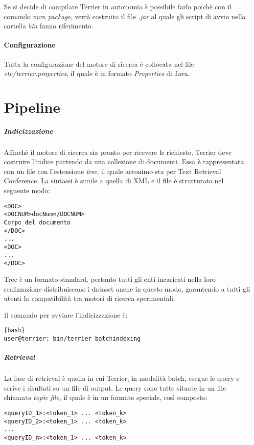 Se si decide di compilare Terrier in autonomia è possibile farlo poichè con il comando \textit{mvn package},
verrà costruito il file \textit{.jar} al quale gli script di avvio nella cartella \textit{bin} fanno riferimento.

\paragraph{Configurazione}
Tutta la configurazione del motore di ricerca è collocata nel file \textit{etc/terrier.properties}, il quale
è in formato \textit{Properties} di Java.

\section{Pipeline}
\subparagraph{Indicizzazione} Affinchè il motore di ricerca sia pronto per ricevere le richieste,
Terrier deve costruire l'indice partendo
da una collezione di documenti. Essa è rappresentata con un file con l'estensione \textit{trec},
il quale acronimo sta per Text Retrieval Conference.
La sintassi è simile a quella di XML e il file è strutturato nel seguente modo:

\begin{lstlisting}
<DOC>
<DOCNUM>docNum</DOCNUM>
Corpo del documento
</DOC>
...
<DOC>
...
</DOC>
\end{lstlisting}

Trec è un formato standard, pertanto tutti gli enti incaricati
nella loro realizzazione distribuiscono i dataset anche in questo
modo, garantendo a tutti gli utenti la compatibilità tra motori
di ricerca sperimentali.

Il comando per avviare l'indicizzazione è:

\begin{lstlisting}{bash}
user@terrier: bin/terrier batchindexing
\end{lstlisting}

\pagebreak

\subparagraph{Retrieval}
La fase di retrieval è quella in cui Terrier, in modalità batch, esegue le query
e scrive i risultati su un file di output.
Le query sono tutte situate in un file chiamato \textit{topic file}, il quale
è in un formato speciale, così composto:
\begin{lstlisting}
<queryID_1>:<token_1> ... <token_k>
<queryID_2>:<token_1> ... <token_k>
...
<queryID_n>:<token_1> ... <token_k>
\end{lstlisting}

